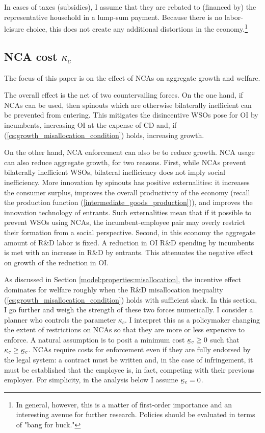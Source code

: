 \documentclass[11pt,english]{article}
\newcommand\munderbar[1]{%
	\underaccent{\bar}{#1}}
\begin{document}
In cases of taxes (subsidies), I assume that they are rebated to (financed by) the representative household in a lump-sum payment. Because there is no labor-leisure choice, this does not create any additional distortions in the economy.\footnote{In general, however, this is a matter of first-order importance and an interesting avenue for further research. Policies should be evaluated in terms of "bang for buck."}

\subsection{NCA cost $\kappa_c$} 

The focus of this paper is on the effect of NCAs on aggregate growth and welfare. 


The overall effect is the net of two countervailing forces. On the one hand, if NCAs can be used, then spinouts which are otherwise bilaterally inefficient can be prevented from entering. This mitigates the disincentive WSOs pose for OI by incumbents, increasing OI at the expense of CD and, if (\ref{cs:growth_misallocation_condition}) holds, increasing growth.

On the other hand, NCA enforcement can also be to reduce growth. NCA usage can also reduce aggregate growth, for two reasons. First, while NCAs prevent bilaterally inefficient WSOs, bilateral inefficiency does not imply social inefficiency. More innovation by spinouts has positive externalities: it increases the consumer surplus, improves the overall productivity of the economy (recall the production function (\ref{intermediate_goods_production})), and improves the innovation technology of entrants. Such externalities mean that if it possible to prevent WSOs using NCAs, the incumbent-employee pair may overly restrict their formation from a social perspective. Second, in this economy the aggregate amount of R\&D labor is fixed. A reduction in OI R\&D spending by incumbents is met with an increase in R\&D by entrants. This attenuates the negative effect on growth of the reduction in OI.

As discussed in Section \ref{model:properties:misallocation}, the incentive effect dominates for welfare roughly when the R\&D misallocation inequality (\ref{cs:growth_misallocation_condition}) holds with sufficient slack. In this section, I go further and weigh the strength of these two forces numerically. I consider a planner who controls the parameter $\kappa_c$. I interpret this as a policymaker changing the extent of restrictions on NCAs so that they are more or less expensive to enforce. A natural assumption is to posit a minimum cost $\munderbar{\kappa}_c \ge 0$ such that $\kappa_c \ge \munderbar{\kappa}_c$. NCAs require costs for enforcement even if they are fully endorsed by the legal system: a contract must be written and, in the case of infringement, it must be established that the employee is, in fact, competing with their previous employer. For simplicity, in the analysis below I assume $\munderbar{\kappa}_c = 0$.
\end{document}
